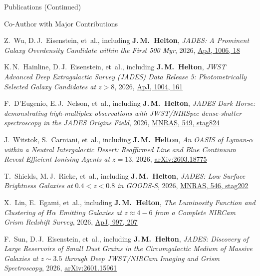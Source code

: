 \documentclass{JMH_CV}
\begin{document}
\begin{rSection}{Publications (Continued)}
\begin{rSubsection}{Co-Author with Major Contributions}{}{}{}
\begin{etaremune}
    \item Z.~Wu, D.\,J.~Eisenstein, et~al., including \textbf{J.\,M.~Helton}, \textit{JADES: A Prominent Galaxy Overdensity Candidate within the First 500 Myr}, 2026, \href{https://www.scixplorer.org/abs/2026ApJ..1006...18W/abstract}{\ul{ApJ, 1006, 18}}

    \item K.\,N.~Hainline, D.\,J.~Eisenstein, et~al., including \textbf{J.\,M.~Helton}, \textit{JWST Advanced Deep Extragalactic Survey (JADES) Data Release 5: Photometrically Selected Galaxy Candidates at $\mathit{z > 8}$}, 2026, \href{https://www.scixplorer.org/abs/2026ApJ..1004..161H/abstract}{\ul{ApJ, 1004, 161}}

    \item F.~D'Eugenio, E.\,J.~Nelson, et~al., including \textbf{J.\,M.~Helton}, \textit{JADES Dark Horse: demonstrating high-multiplex observations with JWST/NIRSpec dense-shutter spectroscopy in the JADES Origins Field}, 2026, \href{https://www.scixplorer.org/abs/2026MNRAS.549ag824D/abstract}{\ul{MNRAS, 549, stag824}}

    \item J.~Witstok, S.~Carniani, et~al., including \textbf{J.\,M.~Helton}, \textit{An OASIS of Lyman-$\mathit{\alpha}$ within a Neutral Intergalactic Desert: Reaffirmed Line and Blue Continuum Reveal Efficient Ionising Agents at $\mathit{z = 13}$}, 2026, \href{https://www.scixplorer.org/abs/2026arXiv260318775W/abstract}{\ul{arXiv:2603.18775}}

    \item T.~Shields, M.\,J.~Rieke, et~al., including \textbf{J.\,M.~Helton}, \textit{JADES: Low Surface Brightness Galaxies at $\mathit{0.4 < z < 0.8}$ in GOODS-S}, 2026, \href{https://www.scixplorer.org/abs/2026MNRAS.546ag202S/abstract}{\ul{MNRAS, 546, stag202}}

    \item X.~Lin, E.~Egami, et~al., including \textbf{J.\,M.~Helton}, \textit{The Luminosity Function and Clustering of $\mathit{H\alpha}$ Emitting Galaxies at $\mathit{z \approx 4-6}$ from a Complete NIRCam Grism Redshift Survey}, 2026, \href{https://www.scixplorer.org/abs/2026ApJ...997..207L/abstract}{\ul{ApJ, 997, 207}}

    \item F.~Sun, D.\,J.~Eisenstein, et~al., including \textbf{J.\,M.~Helton}, \textit{JADES: Discovery of Large Reservoirs of Small Dust Grains in the Circumgalactic Medium of Massive Galaxies at $\mathit{z \sim 3.5}$ through Deep JWST/NIRCam Imaging and Grism Spectroscopy}, 2026, \href{https://www.scixplorer.org/abs/2026arXiv260115961S/abstract}{\ul{arXiv:2601.15961}}


\end{etaremune}
\end{rSubsection}
\end{rSection}
\end{document}

